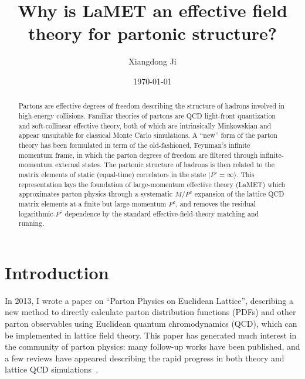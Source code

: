 \documentclass[prd,aps,twocolumn,preprintnumbers,showpacs,nofootinbib,superscriptaddress,notitlepage]{revtex4-1}
\begin{document}
\title{Why is LaMET an effective field theory for partonic structure?}

\author{Xiangdong Ji}


\date{\today{}}

\begin{abstract}
Partons are effective degrees of freedom describing the structure of hadrons
involved in high-energy collisions. Familiar theories of partons are
QCD light-front quantization and soft-collinear effective theory,
both of which are intrinsically Minkowskian and appear unsuitable for
classical Monte Carlo simulations. A ``new'' form of the parton theory
has been formulated in term of the old-fashioned, Feynman's infinite momentum
frame, in which the parton degrees of freedom are filtered
through infinite-momentum external states. The partonic
structure of hadrons is then related to the matrix elements of
static (equal-time) correlators in the state $|P^z=\infty\rangle$. This
representation lays the foundation of large-momentum effective theory (LaMET)
which approximates parton physics through a systematic $M/P^z$ expansion
of the lattice QCD matrix elements at a finite but large momentum $P^z$,
and removes the residual logarithmic-$P^z$ dependence by the
standard effective-field-theory matching and running.

\end{abstract}
\maketitle

\section{Introduction}

In 2013, I wrote a paper on ``Parton Physics on Euclidean Lattice''\cite{Ji:2013dva}, describing
a new method to directly calculate parton distribution functions (PDFs)
and other parton observables using Euclidean quantum chromodynamics (QCD),
which can be implemented in lattice field theory. This paper has generated much interest in the
community of parton physics: many follow-up works have been published, and
a few reviews have appeared describing the rapid progress in both theory and lattice QCD
simulations~\cite{Cichy:2018mum,Ji:2020ect}.
\end{document}
